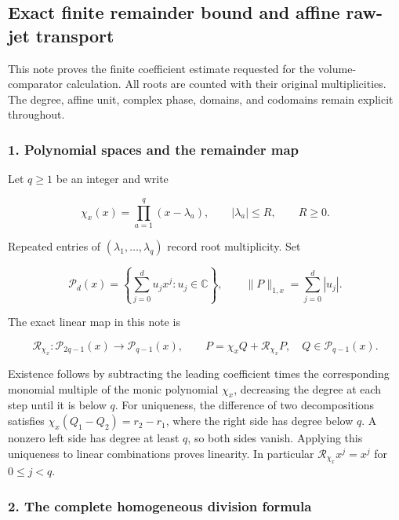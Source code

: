 \subsection{Exact finite remainder bound and affine raw-jet transport}\label{endpoint-relation_balance_original--exact-finite-remainder-bound-and-affine-raw-jet-transport}

This note proves the finite coefficient estimate requested for the volume-comparator calculation. All roots are counted with their original multiplicities. The degree, affine unit, complex phase, domains, and codomains remain explicit throughout.

\subsubsection{1. Polynomial spaces and the remainder map}\label{endpoint-relation_balance_original--polynomial-spaces-and-the-remainder-map}

Let \(q\geq1\) be an integer and write

\[
\chi_x(x)=\prod_{a=1}^{q}(x-\lambda_a),\qquad |\lambda_a|\leq R,
\qquad R\geq0.
\tag{RB.1}
\]

Repeated entries of \((\lambda_1,\ldots,\lambda_q)\) record root multiplicity. Set

\[
\mathcal P_d(x)=\left\{\sum_{j=0}^{d}u_jx^j:u_j\in\mathbb C\right\},
\qquad
\|P\|_{1,x}=\sum_{j=0}^{d}|u_j|.
\tag{RB.2}
\]

The exact linear map in this note is

\[
\mathcal R_{\chi_x}:\mathcal P_{2q-1}(x)\longrightarrow\mathcal P_{q-1}(x),
\qquad P=\chi_x Q+\mathcal R_{\chi_x}P,
\quad Q\in\mathcal P_{q-1}(x).
\tag{RB.3}
\]

Existence follows by subtracting the leading coefficient times the corresponding monomial multiple of the monic polynomial \(\chi_x\), decreasing the degree at each step until it is below \(q\). For uniqueness, the difference of two decompositions satisfies \(\chi_x(Q_1-Q_2)=r_2-r_1\), where the right side has degree below \(q\). A nonzero left side has degree at least \(q\), so both sides vanish. Applying this uniqueness to linear combinations proves linearity. In particular \(\mathcal R_{\chi_x}x^j=x^j\) for \(0\leq j<q\).

\subsubsection{2. The complete homogeneous division formula}\label{endpoint-relation_balance_original--the-complete-homogeneous-division-formula}

